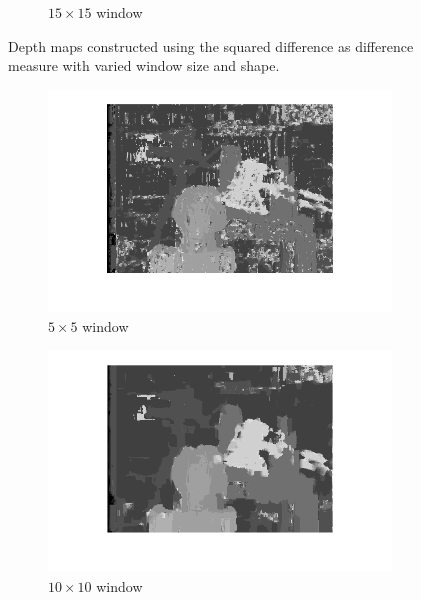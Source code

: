 \documentclass{article}
\begin{document}
\begin{figure}[ht!]
\begin{subfigure}{.3\textwidth}
  \caption{$15\times15$ window}
  \label{fig_s3g}
 \end{subfigure}
 \caption{Depth maps constructed using the squared difference as difference measure with varied window size and shape.}
 \label{fig_s}
\end{figure}



\begin{figure}[ht!]
 \centering
 \begin{subfigure}{.3\textwidth}
  \centering
  \includegraphics[width=\linewidth]{ex3/x5_5.png}
  \caption{$5\times5$ window}
  \label{fig_x1g}
 \end{subfigure}
 \begin{subfigure}{.3\textwidth}
  \centering
  \includegraphics[width=\linewidth]{ex3/x10_10.png}
  \caption{$10\times10$ window}
  \label{fig_x2g}
 \end{subfigure}
 \begin{subfigure}{.3\textwidth}

\end{subfigure}
\end{figure}
\end{document}
